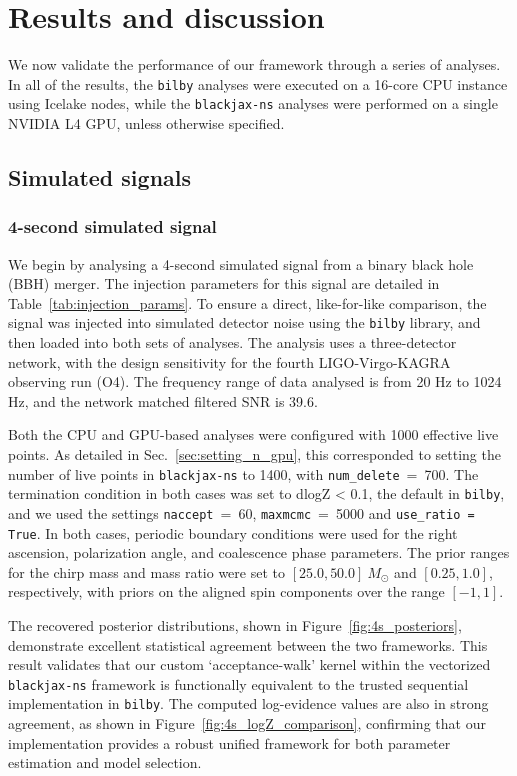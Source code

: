 \documentclass[fleqn,usenatbib]{mnras}
\begin{document}
\section{Results and discussion}
\label{sec:results}

We now validate the performance of our framework through a series of
analyses. In all of the results, the \texttt{bilby} analyses
were executed on a 16-core CPU instance using Icelake nodes, while the \texttt{blackjax-ns}
analyses were performed on a single NVIDIA L4 GPU, unless otherwise specified.

\subsection{Simulated signals}

\subsubsection{4-second simulated signal}
\label{sec:4s_simulated_signal}

We begin by analysing a 4-second simulated signal from a binary black
hole (BBH) merger. The injection parameters for this signal are
detailed in Table~\ref{tab:injection_params}. To ensure a direct,
like-for-like comparison, the signal was injected into simulated
detector noise using the \texttt{bilby} library, and 
then loaded into both sets of analyses. The analysis
uses a three-detector network, with the design
sensitivity for the fourth LIGO-Virgo-KAGRA observing run (O4).
The frequency range of data analysed is from 20 Hz to 1024 Hz, 
and the network matched filtered SNR is 39.6. 

Both the CPU and GPU-based analyses were configured with 1000 effective live
points. As detailed in Sec.~\ref{sec:setting_n_gpu}, this corresponded to
setting the number of live points in \texttt{blackjax-ns} to 1400, with \mbox{\texttt{num\_delete} = 700}.
The termination condition in both cases was set to dlogZ < 0.1, the default in \texttt{bilby},
and we used the settings \mbox{\texttt{naccept} = 60}, \mbox{\texttt{maxmcmc} = 5000} and \mbox{\texttt{use\_ratio = True}}. 
In both cases, periodic boundary conditions were used for the right ascension, 
polarization angle, and coalescence phase parameters. The prior ranges
for the chirp mass and mass ratio were set to $[25.0, 50.0]~M_{\odot}$
and $[0.25, 1.0]$, respectively, with priors on the aligned
spin components over the range $[-1, 1]$. 

The recovered posterior distributions, shown in
Figure~\ref{fig:4s_posteriors}, demonstrate excellent statistical
agreement between the two frameworks. This result validates that our
custom `acceptance-walk' kernel within the vectorized \texttt{blackjax-ns}
framework is functionally equivalent to the trusted sequential
implementation in \texttt{bilby}. The computed log-evidence values are
also in strong agreement, as shown in Figure~\ref{fig:4s_logZ_comparison},
confirming that our implementation provides a robust unified framework for both
parameter estimation and model selection. 
\end{document}

